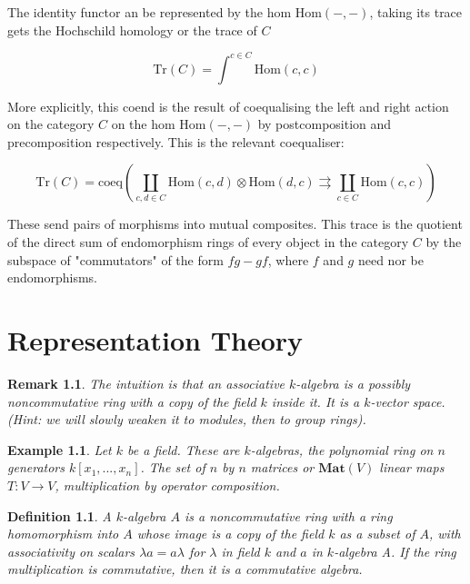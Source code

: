 \documentclass{tufte-book}
\newtheorem{definition}[theorem]{Definition}
\newtheorem{example}[theorem]{Example}
\newtheorem{remark}[theorem]{Remark}
\begin{document}
The identity functor an be represented by the hom $\mathrm{Hom(-,-)}$, taking its trace gets the Hochschild homology or the trace of $C$

\begin{equation}
	\mathrm{Tr}(C) = \int^{c \in C}
	\mathrm{Hom}(c,c)
\end{equation}

More explicitly, this coend is the result of coequalising the left and right action on the category $C$ on the hom $\mathrm{Hom(-,-)}$ by postcomposition and precomposition respectively. This is the relevant coequaliser:

\begin{equation}
	\mathrm{Tr}(C) = \mathrm{coeq}
	\left(
		\coprod_{c, d \in C} \mathrm{Hom}(c,d)
		\otimes
		\mathrm{Hom}(d,c)
		\rightrightarrows 
		\coprod_{c \in C}
		\mathrm{Hom}(c,c)
	\right)
\end{equation}

These send pairs of morphisms into mutual composites. This trace is the quotient of the direct sum of endomorphism rings of every object in the category $C$ by the subspace of 
"commutators" of the form $fg - gf$, where $f$ and $g$ need nor be endomorphisms.

\chapter{Representation Theory}
\label{ch:rep-theory}

\begin{remark}
	The intuition is that an associative $k$-algebra is a possibly noncommutative ring with a copy of the field $k$ inside it. It is a $k$-vector space. (Hint: we will slowly weaken it to modules, then to group rings).
\end{remark}

\begin{example}
	Let $k$ be a field. These are $k$-algebras, the polynomial ring on $n$ generators $k[x_1, ..., x_n]$. The set of $n$ by $n$ matrices or $\mathbf{Mat}(V)$ linear maps $T : V \rightarrow V$, multiplication by operator composition.
\end{example}

\begin{definition}
	A $k$-algebra $A$ is a noncommutative ring with a ring homomorphism into $A$ whose image is a copy of the field $k$ as a subset of $A$, with associativity on scalars $\lambda a = a \lambda$ for $\lambda$ in field $k$ and $a$ in $k$-algebra A. If the ring multiplication is commutative, then it is a commutative algebra.  
\end{definition}
\end{document}
